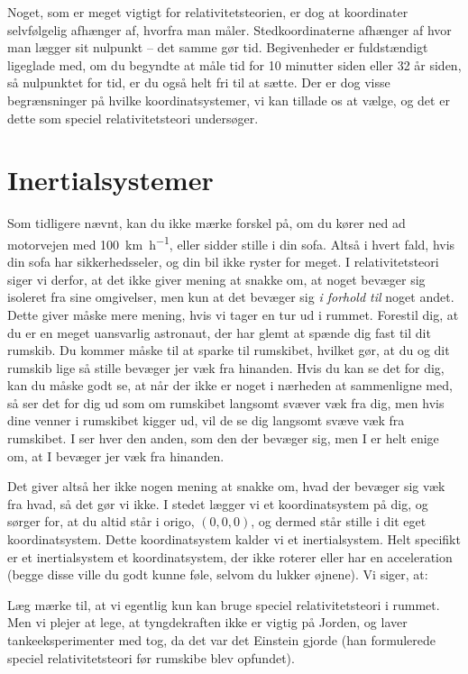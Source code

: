 \documentclass[crop=false, class=memoir]{standalone}
\begin{document}
Noget, som er meget vigtigt for relativitetsteorien, er dog at koordinater selvfølgelig afhænger af, hvorfra man måler. Stedkoordinaterne afhænger af hvor man lægger sit nulpunkt -- det samme gør tid. Begivenheder er fuldstændigt ligeglade med, om du begyndte at måle tid for 10 minutter siden eller 32 år siden, så nulpunktet for tid, er du også helt fri til at sætte. Der er dog visse begrænsninger på hvilke koordinatsystemer, vi kan tillade os at vælge, og det er dette som speciel relativitetsteori undersøger.


\section{Inertialsystemer} %
Som tidligere nævnt, kan du ikke mærke forskel på, om du kører ned ad motorvejen med \SI{100}{\km\per\hour}, eller sidder stille i din sofa. Altså i hvert fald, hvis din sofa har sikkerhedsseler, og din bil ikke ryster for meget. I relativitetsteori siger vi derfor, at det ikke giver mening at snakke om, at noget bevæger sig isoleret fra sine omgivelser, men kun at det bevæger sig \emph{i forhold til} noget andet. Dette giver måske mere mening, hvis vi tager en tur ud i rummet. Forestil dig, at du er en meget uansvarlig astronaut, der har glemt at spænde dig fast til dit rumskib. Du kommer måske til at sparke til rumskibet, hvilket gør, at du og dit rumskib lige så stille bevæger jer væk fra hinanden. Hvis du kan se det for dig, kan du måske godt se, at når der ikke er noget i nærheden at sammenligne med, så ser det for dig ud som om rumskibet langsomt svæver væk fra dig, men hvis dine venner i rumskibet kigger ud, vil de se dig langsomt svæve væk fra rumskibet. I ser hver den anden, som den der bevæger sig, men I er helt enige om, at I bevæger jer væk fra hinanden.

Det giver altså her ikke nogen mening at snakke om, hvad der bevæger sig væk fra hvad, så det gør vi ikke. I stedet lægger vi et koordinatsystem på dig, og sørger for, at du altid står i origo, $(0,0,0)$, og dermed står stille i dit eget koordinatsystem. Dette koordinatsystem kalder vi et inertialsystem. Helt specifikt er et inertialsystem et koordinatsystem, der ikke roterer eller har en acceleration (begge disse ville du godt kunne føle, selvom du lukker øjnene).
Vi siger, at:
%
\begin{center}
\end{center}
%
Læg mærke til, at vi egentlig kun kan bruge speciel relativitetsteori i rummet. Men vi plejer at lege, at tyngdekraften ikke er vigtig på Jorden, og laver tankeeksperimenter med tog, da det var det Einstein gjorde (han formulerede speciel relativitetsteori før rumskibe blev opfundet).
\end{document}
